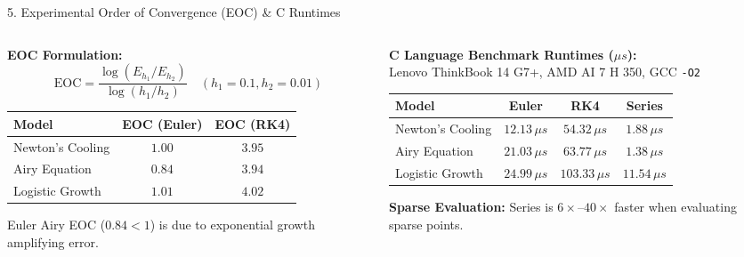 \documentclass[aspectratio=169]{beamer}
\begin{document}
\begin{frame}{5. Experimental Order of Convergence (EOC) \& C Runtimes}
  \small
  \begin{columns}[T]
    \begin{column}{0.46\textwidth}
      \textbf{EOC Formulation\footnotemark[1]:}
      $$\mathrm{EOC} = \frac{\log(E_{h_1}/E_{h_2})}{\log(h_1/h_2)} \quad (h_1=0.1, h_2=0.01)$$
      \centering
      \vskip2pt
      \scriptsize
      \setlength{\tabcolsep}{4pt}
      \begin{tabular}{lcc}
        \toprule
        \textbf{Model} & \textbf{EOC (Euler)} & \textbf{EOC (RK4)} \\
        \midrule
        Newton's Cooling & $1.00$ & $3.95$ \\
        Airy Equation    & $0.84$ & $3.94$ \\
        Logistic Growth  & $1.01$ & $4.02$ \\
        \bottomrule
      \end{tabular}
      \vskip2pt
      \raggedright
      \scriptsize
      Euler Airy EOC ($0.84 < 1$) is due to exponential growth amplifying error.
    \end{column}
    \begin{column}{0.51\textwidth}
      \textbf{C Language Benchmark Runtimes ($\mu s$)\footnotemark[2]:}\\
      {\scriptsize Lenovo ThinkBook 14 G7+, AMD AI 7 H 350, GCC \texttt{-O2}}
      \centering
      \vskip2pt
      \scriptsize
      \setlength{\tabcolsep}{3pt}
      \begin{tabular}{lccc}
        \toprule
        \textbf{Model} & \textbf{Euler} & \textbf{RK4} & \textbf{Series} \\
        \midrule
        Newton's Cooling & $12.13\,\mu s$ & $54.32\,\mu s$ & $1.88\,\mu s$ \\
        Airy Equation    & $21.03\,\mu s$ & $63.77\,\mu s$ & $1.38\,\mu s$ \\
        Logistic Growth  & $24.99\,\mu s$ & $103.33\,\mu s$ & $11.54\,\mu s$ \\
        \bottomrule
      \end{tabular}
      \vskip2pt
      \raggedright
      \scriptsize
      \textbf{Sparse Evaluation\footnotemark[3]:} Series is $6\times$--$40\times$ faster when evaluating sparse points.
    \end{column}
  \end{columns}
  \vskip4pt
\end{frame}
\end{document}
